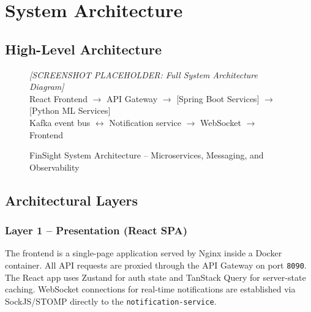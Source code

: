 \documentclass[12pt,a4paper]{report}
\begin{document}
\chapter{System Architecture}

\section{High-Level Architecture}

\begin{figure}[H]
  \centering
  \begin{tcolorbox}[enhanced, colback=gray!10, colframe=gray!50,
      width=\linewidth, height=9cm, arc=6pt, valign=center, halign=center]
    \textcolor{gray!70}{\Large\textit{[SCREENSHOT PLACEHOLDER: Full System Architecture Diagram]}}\\[6pt]
    \textcolor{gray!60}{\small React Frontend $\rightarrow$ API Gateway $\rightarrow$ [Spring Boot Services] $\rightarrow$ [Python ML Services]}\\
    \textcolor{gray!60}{\small Kafka event bus $\leftrightarrow$ Notification service $\rightarrow$ WebSocket $\rightarrow$ Frontend}
  \end{tcolorbox}
  \caption{FinSight System Architecture -- Microservices, Messaging, and Observability}
\end{figure}

\section{Architectural Layers}

\subsection{Layer 1 -- Presentation (React SPA)}
The frontend is a single-page application served by Nginx inside a Docker container. All API requests are proxied through the API Gateway on port \texttt{8090}. The React app uses Zustand for auth state and TanStack Query for server-state caching. WebSocket connections for real-time notifications are established via SockJS/STOMP directly to the \texttt{notification-service}.
\end{document}
